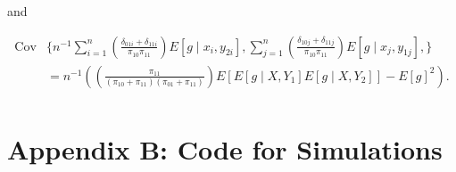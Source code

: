\documentclass[
  letterpaper,
  DIV=11,
  numbers=noendperiod]{scrartcl}
\newcommand{\Cov}{{\text{Cov}}}
\begin{document}
and

\begin{align*}
\Cov&\{n^{-1} \sum_{i = 1}^n \left(
\frac{\delta_{01i} + \delta_{11i}}{\pi_{10} \pi_{11}}\right) E[g \mid x_i, y_{2i}],
\sum_{j = 1}^n \left(
\frac{\delta_{10j} + \delta_{11j}}{\pi_{10} \pi_{11}}\right) E[g \mid x_j, y_{1j}],
\}\\
&= n^{-1}\left(\left(\frac{\pi_{11}}{(\pi_{10} + \pi_{11})(\pi_{01} + \pi_{11})}\right) E[E[g \mid X, Y_1]E[g \mid X, Y_2]] - E[g]^2\right).\\
\end{align*}

\hypertarget{appendix-b-code-for-simulations}{%
\section{Appendix B: Code for
Simulations}\label{appendix-b-code-for-simulations}}
\end{document}
